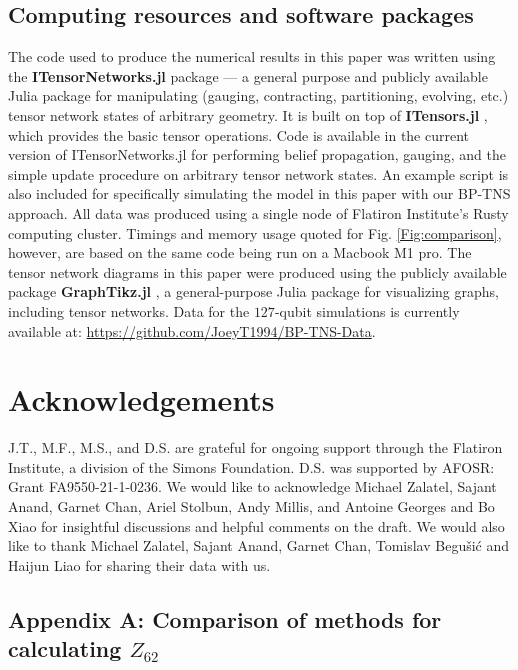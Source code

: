 \documentclass[%
 superscriptaddress,
 amsmath,amssymb,
 prx, nofootinbib,
]{revtex4-2}
\begin{document}
\subsection*{Computing resources and software packages}
\label{Subsec:ComputingResources}
The code used to produce the numerical results in this paper was written using the \textbf{ITensorNetworks.jl} package \cite{ITensorNetworks} --- a general purpose and publicly available Julia \cite{bezanson2017julia} package for manipulating (gauging, contracting, partitioning, evolving, etc.) tensor network states of arbitrary geometry. It is built on top of \textbf{ITensors.jl} \cite{itensor-r0.3}, which provides the basic tensor operations. 
Code is available in the current version of ITensorNetworks.jl for performing belief propagation, gauging, and the simple update procedure on arbitrary tensor network states. An example script is also included for specifically simulating the model in this paper with our BP-TNS approach.
All data was produced using a single node of Flatiron Institute's Rusty computing cluster. Timings and memory usage quoted for Fig. \ref{Fig:comparison}, however, are based on the same code being run on a Macbook M1 pro. The tensor network diagrams in this paper were produced using the publicly available package \textbf{GraphTikz.jl} \cite{GraphTikz}, a general-purpose Julia package for visualizing graphs, including tensor networks. Data for the $127$-qubit simulations is currently available at: \href{https://github.com/JoeyT1994/BP-TNS-Data}{https://github.com/JoeyT1994/BP-TNS-Data}.

\section*{Acknowledgements}
J.T., M.F., M.S., and D.S. are grateful for ongoing support through the Flatiron Institute, a division of the Simons Foundation. D.S. was supported by AFOSR: Grant FA9550-21-1-0236. We would like to acknowledge Michael Zalatel, Sajant Anand, Garnet Chan, Ariel Stolbun, Andy Millis, and Antoine Georges and Bo Xiao for insightful discussions and helpful comments on the draft. We would also like to thank Michael Zalatel, Sajant Anand, Garnet Chan, Tomislav Begušić and Haijun Liao for sharing their data with us. 



\newpage 
\subsection*{Appendix A: Comparison of methods for calculating $Z_{62}$}
\label{Subsec:Comparison}
\end{document}
